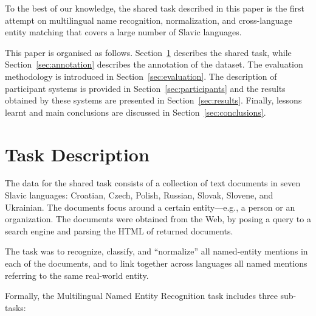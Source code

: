 \documentclass[11pt]{article}
\begin{document}
To the best of our knowledge, the shared task described in this paper is
the first attempt on multilingual name recognition, normalization, and
cross-language entity matching that covers a large number of Slavic
languages.

This paper is organised as follows. Section~\ref{sec:task} describes the
shared task, while Section~\ref{sec:annotation} describes the annotation
of the dataset.  The evaluation methodology is introduced in
Section~\ref{sec:evaluation}.  The description of participant systems is
provided in Section~\ref{sec:participants} and the results obtained by
these systems are presented in Section~\ref{sec:results}.  Finally,
lessons learnt and main conclusions are discussed in
Section~\ref{sec:conclusions}.

\section{Task Description}
\label{sec:task}


The data for the shared task consists of a collection of text documents
{in seven Slavic languages: Croatian, Czech, Polish, Russian, Slovak,
  Slovene, and Ukrainian. The documents focus around a certain
  entity---e.g., a person or an organization. The documents were obtained
  from the Web, by posing a query to a search engine and parsing the HTML
  of returned documents.}

The task {was} to recognize, classify, and ``normalize'' all named-entity
mentions in each of the documents, and to link together across languages
all named mentions referring to the same real-world entity.

Formally, the Multilingual Named Entity Recognition task includes three
sub-tasks:
\end{document}

